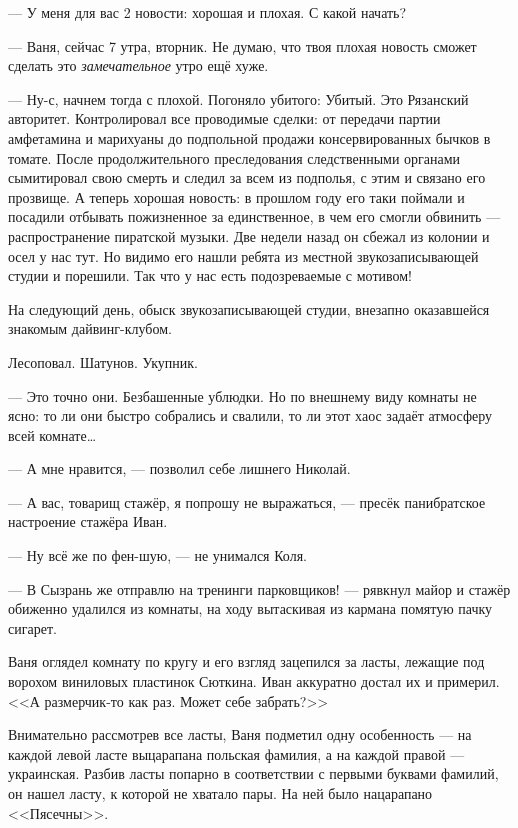 --- У меня для вас 2 новости: хорошая и плохая. С какой начать?

--- Ваня, сейчас 7 утра, вторник. Не думаю, что твоя плохая новость сможет сделать это \emph{замечательное} утро ещё хуже.

--- Ну-с, начнем тогда с плохой. Погоняло убитого: Убитый. Это Рязанский авторитет. Контролировал все проводимые сделки: от передачи партии амфетамина и марихуаны до подпольной продажи консервированных бычков в томате. После продолжительного преследования следственными органами сымитировал свою смерть и следил за всем из подполья, с этим и связано его прозвище. А теперь хорошая новость: в прошлом году его таки поймали и посадили отбывать пожизненное за единственное, в чем его смогли обвинить --- распространение пиратской музыки. Две недели назад он сбежал из колонии и осел у нас тут. Но видимо его нашли ребята из местной звукозаписывающей студии и порешили. Так что у нас есть подозреваемые с мотивом!

\asterisks

На следующий день, обыск звукозаписывающей студии, внезапно оказавшейся знакомым дайвинг-клубом.

Лесоповал. Шатунов. Укупник.

--- Это точно они. Безбашенные ублюдки. Но по внешнему виду комнаты не ясно: то ли они быстро собрались и свалили, то ли этот хаос задаёт атмосферу всей комнате\ldots

--- А мне нравится, --- позволил себе лишнего Николай.

--- А вас, товарищ стажёр, я попрошу не выражаться, --- пресёк панибратское настроение стажёра Иван.

--- Ну всё же по фен-шую, --- не унимался Коля.

--- В Сызрань же отправлю на тренинги парковщиков! --- рявкнул майор и стажёр обиженно удалился из комнаты, на ходу вытаскивая из кармана помятую пачку сигарет.

Ваня оглядел комнату по кругу и его взгляд зацепился за ласты, лежащие под ворохом виниловых пластинок Сюткина. Иван аккуратно достал их и примерил. <<А размерчик-то как раз. Может себе забрать?>>

Внимательно рассмотрев все ласты, Ваня подметил одну особенность --- на каждой левой ласте выцарапана польская фамилия, а на каждой правой --- украинская. Разбив ласты попарно в соответствии с первыми буквами фамилий, он нашел ласту, к которой не хватало пары. На ней было нацарапано <<Пясечны>>.

\asterisks

